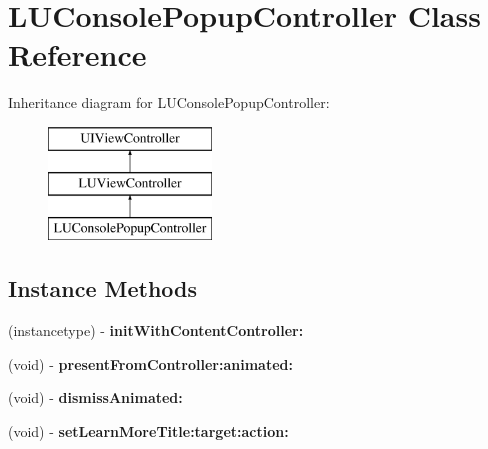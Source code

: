\hypertarget{interface_l_u_console_popup_controller}{}\section{L\+U\+Console\+Popup\+Controller Class Reference}
\label{interface_l_u_console_popup_controller}
Inheritance diagram for L\+U\+Console\+Popup\+Controller\+:\begin{figure}[H]
\begin{center}
\leavevmode
\includegraphics[height=3.000000cm]{interface_l_u_console_popup_controller}
\end{center}
\end{figure}
\subsection*{Instance Methods}
\begin{DoxyCompactItemize}
\item 
\mbox{\label{interface_l_u_console_popup_controller_ac11d74ef1faa91f2994fd3c4d6d72545}} 
(instancetype) -\/ {\bfseries init\+With\+Content\+Controller\+:}
\item 
\mbox{\label{interface_l_u_console_popup_controller_a528c5d40118007ece20b05f14d710b0d}} 
(void) -\/ {\bfseries present\+From\+Controller\+:animated\+:}
\item 
\mbox{\label{interface_l_u_console_popup_controller_a71573f32a1764d1795c322c45ec2813d}} 
(void) -\/ {\bfseries dismiss\+Animated\+:}
\item 
\mbox{\label{interface_l_u_console_popup_controller_aa3d3183278f64ef709ec85977fb373ea}} 
(void) -\/ {\bfseries set\+Learn\+More\+Title\+:target\+:action\+:}
\end{DoxyCompactItemize}
